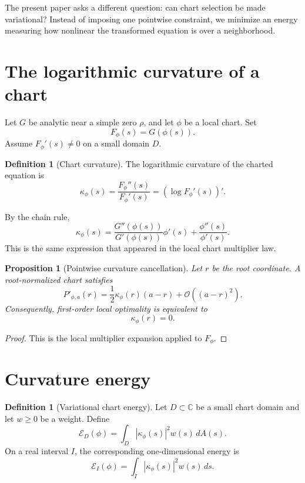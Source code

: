\documentclass[11pt]{article}
\newtheorem{proposition}[theorem]{Proposition}
\theoremstyle{definition}
\newtheorem{definition}[theorem]{Definition}
\newcommand{\C}{\mathbb C}
\newcommand{\E}{\mathcal E}
\newcommand{\Oterm}{\mathcal O}
\begin{document}
The present paper asks a different question: can chart selection be made variational? Instead of imposing one pointwise constraint, we minimize an energy measuring how nonlinear the transformed equation is over a neighborhood.

\section{The logarithmic curvature of a chart}

Let $G$ be analytic near a simple zero $\rho$, and let $\phi$ be a local chart. Set
\[
F_\phi(s)=G(\phi(s)).
\]
Assume $F_\phi'(s)\neq0$ on a small domain $D$.

\begin{definition}[Chart curvature]
The logarithmic curvature of the charted equation is
\begin{equation}\label{eq:kappa}
\kappa_\phi(s)=\frac{F_\phi''(s)}{F_\phi'(s)}
=(\log F_\phi'(s))'.
\end{equation}
\end{definition}

By the chain rule,
\begin{equation}\label{eq:kappa-transform}
\kappa_\phi(s)
=
\frac{G''(\phi(s))}{G'(\phi(s))}\phi'(s)
+
\frac{\phi''(s)}{\phi'(s)}.
\end{equation}
This is the same expression that appeared in the local chart multiplier law.

\begin{proposition}[Pointwise curvature cancellation]
Let $r$ be the root coordinate. A root-normalized chart satisfies
\[
P'_{\phi,a}(r)=\frac12\kappa_\phi(r)(a-r)+\Oterm((a-r)^2).
\]
Consequently, first-order local optimality is equivalent to
\[
\kappa_\phi(r)=0.
\]
\end{proposition}

\begin{proof}
This is the local multiplier expansion applied to $F_\phi$.
\end{proof}

\section{Curvature energy}

\begin{definition}[Variational chart energy]
Let $D\subset\C$ be a small chart domain and let $w\ge0$ be a weight. Define
\begin{equation}\label{eq:energy}
\E_D(\phi)=\int_D |\kappa_\phi(s)|^2w(s)\,dA(s).
\end{equation}
On a real interval $I$, the corresponding one-dimensional energy is
\[
\E_I(\phi)=\int_I |\kappa_\phi(s)|^2w(s)\,ds.
\]
\end{definition}
\end{document}
